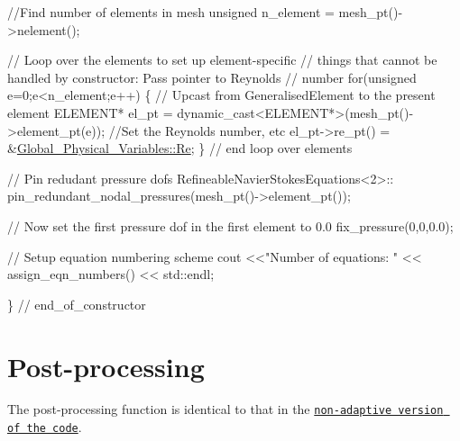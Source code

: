 \begin{DoxyCodeInclude}
 \textcolor{comment}{//Find number of elements in mesh}
 \textcolor{keywordtype}{unsigned} n\_element = mesh\_pt()->nelement();

 \textcolor{comment}{// Loop over the elements to set up element-specific }
 \textcolor{comment}{// things that cannot be handled by constructor: Pass pointer to Reynolds}
 \textcolor{comment}{// number}
 \textcolor{keywordflow}{for}(\textcolor{keywordtype}{unsigned} e=0;e<n\_element;e++)
  \{
   \textcolor{comment}{// Upcast from GeneralisedElement to the present element}
   ELEMENT* el\_pt = \textcolor{keyword}{dynamic\_cast<}ELEMENT*\textcolor{keyword}{>}(mesh\_pt()->element\_pt(e));
   \textcolor{comment}{//Set the Reynolds number, etc}
   el\_pt->re\_pt() = &\hyperlink{namespaceGlobal__Physical__Variables_ab814e627d2eb5bc50318879d19ab16b9}{Global\_Physical\_Variables::Re};
  \} \textcolor{comment}{// end loop over elements}
 
 \textcolor{comment}{// Pin redudant pressure dofs}
 RefineableNavierStokesEquations<2>::
  pin\_redundant\_nodal\_pressures(mesh\_pt()->element\_pt());
 
  \textcolor{comment}{// Now set the first pressure dof in the first element to 0.0}
 fix\_pressure(0,0,0.0);
 
 \textcolor{comment}{// Setup equation numbering scheme}
 cout <<\textcolor{stringliteral}{"Number of equations: "} << assign\_eqn\_numbers() << std::endl; 
 
\} \textcolor{comment}{// end\_of\_constructor}

\end{DoxyCodeInclude}




 

\hypertarget{index_doc}{}\section{Post-\/processing}\label{index_doc}
The post-\/processing function is identical to that in the \href{../../driven_cavity/html/index.html#doc}{\tt non-\/adaptive version of the code}.


